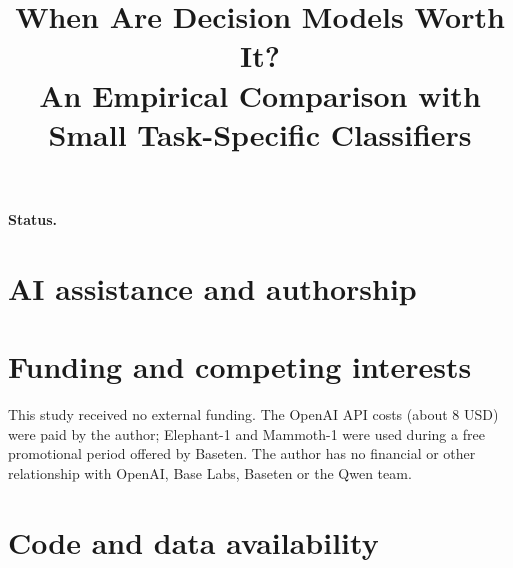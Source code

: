 \documentclass[11pt]{article}
\title{When Are Decision Models Worth It?\\
\large An Empirical Comparison with Small Task-Specific Classifiers}
\author{\PaperAuthors}
\date{\PaperVersionLine}
\begin{document}
\maketitle

\begin{abstract}

\end{abstract}

\noindent\textbf{Status.} \PaperStatus











\section*{AI assistance and authorship}


\section*{Funding and competing interests}
This study received no external funding. The OpenAI API costs (about 8 USD) were paid by the author; Elephant-1 and Mammoth-1 were
used during a free promotional period offered by Baseten. The author has no financial or other relationship with OpenAI, Base Labs,
Baseten or the Qwen team.

\section*{Code and data availability}





\appendix

\end{document}
